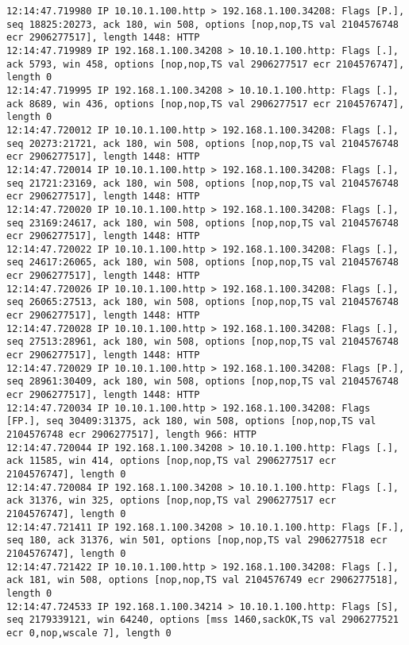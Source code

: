 \documentclass{article}
\begin{document}
{\begin{lstlisting}
12:14:47.719980 IP 10.10.1.100.http > 192.168.1.100.34208: Flags [P.], seq 18825:20273, ack 180, win 508, options [nop,nop,TS val 2104576748 ecr 2906277517], length 1448: HTTP
12:14:47.719989 IP 192.168.1.100.34208 > 10.10.1.100.http: Flags [.], ack 5793, win 458, options [nop,nop,TS val 2906277517 ecr 2104576747], length 0
12:14:47.719995 IP 192.168.1.100.34208 > 10.10.1.100.http: Flags [.], ack 8689, win 436, options [nop,nop,TS val 2906277517 ecr 2104576747], length 0
12:14:47.720012 IP 10.10.1.100.http > 192.168.1.100.34208: Flags [.], seq 20273:21721, ack 180, win 508, options [nop,nop,TS val 2104576748 ecr 2906277517], length 1448: HTTP
12:14:47.720014 IP 10.10.1.100.http > 192.168.1.100.34208: Flags [.], seq 21721:23169, ack 180, win 508, options [nop,nop,TS val 2104576748 ecr 2906277517], length 1448: HTTP
12:14:47.720020 IP 10.10.1.100.http > 192.168.1.100.34208: Flags [.], seq 23169:24617, ack 180, win 508, options [nop,nop,TS val 2104576748 ecr 2906277517], length 1448: HTTP
12:14:47.720022 IP 10.10.1.100.http > 192.168.1.100.34208: Flags [.], seq 24617:26065, ack 180, win 508, options [nop,nop,TS val 2104576748 ecr 2906277517], length 1448: HTTP
12:14:47.720026 IP 10.10.1.100.http > 192.168.1.100.34208: Flags [.], seq 26065:27513, ack 180, win 508, options [nop,nop,TS val 2104576748 ecr 2906277517], length 1448: HTTP
12:14:47.720028 IP 10.10.1.100.http > 192.168.1.100.34208: Flags [.], seq 27513:28961, ack 180, win 508, options [nop,nop,TS val 2104576748 ecr 2906277517], length 1448: HTTP
12:14:47.720029 IP 10.10.1.100.http > 192.168.1.100.34208: Flags [P.], seq 28961:30409, ack 180, win 508, options [nop,nop,TS val 2104576748 ecr 2906277517], length 1448: HTTP
12:14:47.720034 IP 10.10.1.100.http > 192.168.1.100.34208: Flags [FP.], seq 30409:31375, ack 180, win 508, options [nop,nop,TS val 2104576748 ecr 2906277517], length 966: HTTP
12:14:47.720044 IP 192.168.1.100.34208 > 10.10.1.100.http: Flags [.], ack 11585, win 414, options [nop,nop,TS val 2906277517 ecr 2104576747], length 0
12:14:47.720084 IP 192.168.1.100.34208 > 10.10.1.100.http: Flags [.], ack 31376, win 325, options [nop,nop,TS val 2906277517 ecr 2104576747], length 0
12:14:47.721411 IP 192.168.1.100.34208 > 10.10.1.100.http: Flags [F.], seq 180, ack 31376, win 501, options [nop,nop,TS val 2906277518 ecr 2104576747], length 0
12:14:47.721422 IP 10.10.1.100.http > 192.168.1.100.34208: Flags [.], ack 181, win 508, options [nop,nop,TS val 2104576749 ecr 2906277518], length 0
12:14:47.724533 IP 192.168.1.100.34214 > 10.10.1.100.http: Flags [S], seq 2179339121, win 64240, options [mss 1460,sackOK,TS val 2906277521 ecr 0,nop,wscale 7], length 0

\end{lstlisting}}
\end{document}
